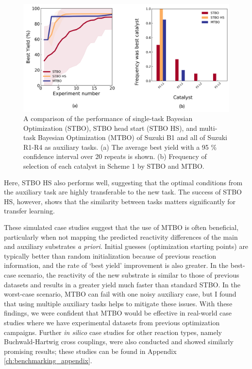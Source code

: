 \begin{figure}
    \includegraphics[width=\textwidth]{gfx/Chapter04/catalyst_optimization.png}

    \caption{A comparison of the performance of single-task Bayesian Optimization (STBO), STBO head start (STBO HS), and multi-task Bayesian Optimization (MTBO) of Suzuki B1 and all of Suzuki R1-R4 as auxiliary tasks. (a)  The average best yield with a 95 \% confidence interval over 20 repeats is shown.  (b) Frequency of selection of each catalyst in Scheme 1 by STBO and MTBO.}
    \label{fig:baumgartner_suzuki_reizman_suzuki_all_cotraining_optimization}
\end{figure}

Here, STBO HS also performs well, suggesting that the optimal conditions from the auxiliary task are highly transferable to the new task. The success of STBO HS, however, shows that the similarity between tasks matters significantly for transfer learning.  

These simulated case studies suggest that the use of MTBO is often beneficial, particularly when not mapping the predicted reactivity differences of the main and auxiliary substrates \textit{a priori}. Initial guesses (optimization starting points) are typically better than random initialization because of previous reaction information, and the rate of `best yield' improvement is also greater. In the best-case scenario, the reactivity of the new substrate is similar to those of previous datasets and results in a greater yield much faster than standard STBO. In the worst-case scenario, MTBO can fail with one noisy auxiliary case, but I found that using multiple auxiliary tasks helps to mitigate these issues.  With these findings, we were confident that MTBO would be effective in real-world case studies where we have experimental datasets from previous optimization campaigns. Further \textit{in silico} case studies for other reaction types, namely Buchwald-Hartwig cross couplings, were also conducted and showed similarly promising results; these studies can be found in Appendix \ref{ch:benchmarking_appendix}.

